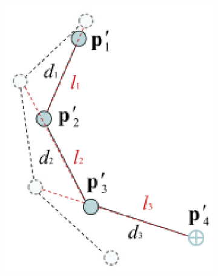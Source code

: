 \begin{figure}
\begin{subfigure}{0.2\textwidth}
        \subcaption{}
        \label{fig:fabrik3}
    \end{subfigure}
    \begin{subfigure}{0.2\textwidth}
        \centering
        \includegraphics[width=\linewidth]{grafika/fabrik_iteration4.eps}
        \subcaption{}
        \label{fig:fabrik4}
    \end{subfigure}
    \begin{subfigure}{0.2\textwidth}
        \centering

\end{subfigure}
\end{figure}
